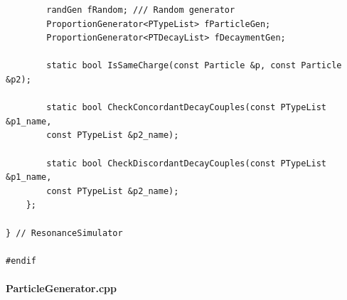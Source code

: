 \documentclass[12pt, a4paper]{article}
\begin{document}
\begin{verbatim}
        randGen fRandom; /// Random generator
        ProportionGenerator<PTypeList> fParticleGen;
        ProportionGenerator<PTDecayList> fDecaymentGen;

        static bool IsSameCharge(const Particle &p, const Particle &p2);

        static bool CheckConcordantDecayCouples(const PTypeList &p1_name, 
        const PTypeList &p2_name);

        static bool CheckDiscordantDecayCouples(const PTypeList &p1_name, 
        const PTypeList &p2_name);
    };

} // ResonanceSimulator

#endif 

\end{verbatim}

\paragraph{ParticleGenerator.cpp}
\end{document}
